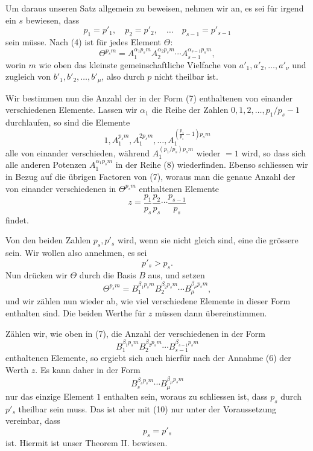 \documentclass[11pt]{article}
\begin{document}
Um daraus unseren Satz allgemein zu beweisen, nehmen wir an, es sei für irgend ein $s$ bewiesen, dass
\begin{equation}
p_1=p'_1,
\quad p_2=p'_2,
\quad\ldots\quad
p_{s-1}=p'_{s-1}
\tag{6}
\end{equation}
sein müsse. Nach (4) ist für jedes Element $\Theta$:
\begin{equation}
\Theta^{p_sm}
=A_1^{\alpha_1p_sm}A_2^{\alpha_2p_sm}\cdots A_{s-1}^{\alpha_{s-1}p_sm},
\tag{7}
\end{equation}
worin $m$ wie oben das kleinste gemeinschaftliche Vielfache von $a'_1,a'_2,\ldots,a'_\nu$ und zugleich von $b'_1,b'_2,\ldots,b'_\mu$, also durch $p$ nicht theilbar ist.

Wir bestimmen nun die Anzahl der in der Form (7) enthaltenen von einander verschiedenen Elemente. Lassen wir $\alpha_1$ die Reihe der Zahlen $0,1,2,\ldots,p_1/p_s-1$ durchlaufen, so sind die Elemente
\begin{equation}
1,
A_1^{p_sm},
A_1^{2p_sm},
\ldots,
A_1^{\left(\frac{p_1}{p_s}-1\right)p_sm}
\tag{8}
\end{equation}
alle von einander verschieden, während $A_1^{(p_1/p_s)p_sm}$ wieder $=1$ wird, so dass sich alle anderen Potenzen $A_1^{\alpha_1p_sm}$ in der Reihe (8) wiederfinden. Ebenso schliessen wir in Bezug auf die übrigen Factoren von (7), woraus man die genaue Anzahl der von einander verschiedenen in $\Theta^{p_sm}$ enthaltenen Elemente
\begin{equation}
z=\frac{p_1}{p_s}\frac{p_2}{p_s}\cdots\frac{p_{s-1}}{p_s}
\tag{9}
\end{equation}
findet.

Von den beiden Zahlen $p_s,p'_s$ wird, wenn sie nicht gleich sind, eine die grössere sein. Wir wollen also annehmen, es sei
\begin{equation}
p'_s>p_s.
\tag{10}
\end{equation}
Nun drücken wir $\Theta$ durch die Basis $B$ aus, und setzen
\begin{equation}
\Theta^{p_sm}=B_1^{\beta_1p_sm}B_2^{\beta_2p_sm}\cdots B_\mu^{\beta_\mu p_sm},
\tag{11}
\end{equation}
und wir zählen nun wieder ab, wie viel verschiedene Elemente in dieser Form enthalten sind. Die beiden Werthe für $z$ müssen dann übereinstimmen.

Zählen wir, wie oben in (7), die Anzahl der verschiedenen in der Form
\begin{equation}
B_1^{\beta_1p_sm}B_2^{\beta_2p_sm}\cdots B_{s-1}^{\beta_{s-1}p_sm}
\tag{12}
\end{equation}
enthaltenen Elemente, so ergiebt sich auch hierfür nach der Annahme (6) der Werth $z$. Es kann daher in der Form
\begin{equation}
B_s^{\beta_sp_sm}\cdots B_\mu^{\beta_\mu p_sm}
\tag{13}
\end{equation}
nur das einzige Element $1$ enthalten sein, woraus zu schliessen ist, dass $p_s$ durch $p'_s$ theilbar sein muss. Das ist aber mit (10) nur unter der Voraussetzung vereinbar, dass
\begin{equation}
p_s=p'_s
\tag{14}
\end{equation}
ist. Hiermit ist unser Theorem II. bewiesen.
\end{document}
